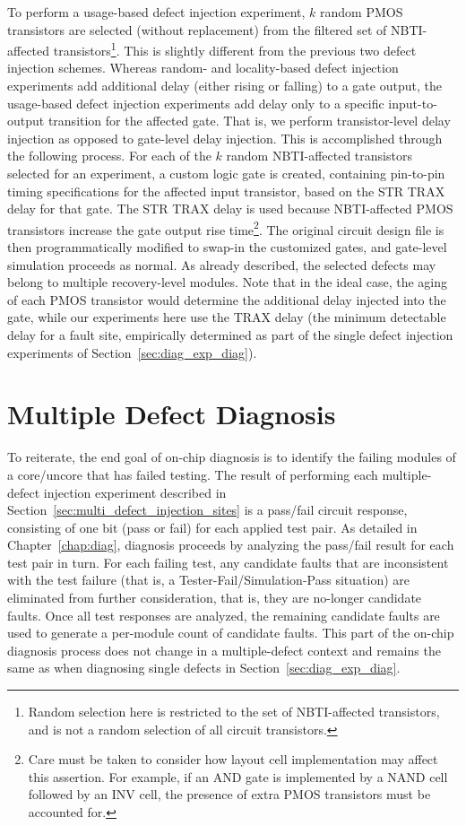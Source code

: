 To perform a usage-based defect injection experiment, $k$ random PMOS transistors are selected (without replacement) from the filtered set of NBTI-affected transistors\footnote{Random selection here is restricted to the set of NBTI-affected transistors, and is not a random selection of all circuit transistors.}.
%
This is slightly different from the previous two defect injection schemes.
%
Whereas random- and locality-based defect injection experiments add additional delay (either rising or falling) to a gate output, the usage-based defect injection experiments add delay only to a specific input-to-output transition for the affected gate.
%
That is, we perform transistor-level delay injection as opposed to gate-level delay injection.
%
This is accomplished through the following process.
%
For each of the $k$ random NBTI-affected transistors selected for an experiment, a custom logic gate is created, containing pin-to-pin timing specifications for the affected input transistor, based on the STR TRAX delay for that gate.
%
The STR TRAX delay is used because NBTI-affected PMOS transistors increase the gate output rise time\footnote{Care must be taken to consider how layout cell implementation may affect this assertion.
%
For example, if an AND gate is implemented by a NAND cell followed by an INV cell, the presence of extra PMOS transistors must be accounted for.}.
%
The original circuit design file is then programmatically modified to swap-in the customized gates, and gate-level simulation proceeds as normal.
%
As already described, the selected defects may belong to multiple recovery-level modules.
%
Note that in the ideal case, the aging of each PMOS transistor would determine the additional delay injected into the gate, while our experiments here use the TRAX delay (the minimum detectable delay for a fault site, empirically determined as part of the single defect injection experiments of Section~\ref{sec:diag_exp_diag}).


\section{Multiple Defect Diagnosis}
\label{sec:multi_diagnosis}
To reiterate, the end goal of on-chip diagnosis is to identify the failing modules of a core/uncore that has failed testing.
%
The result of performing each multiple-defect injection experiment described in Section~\ref{sec:multi_defect_injection_sites} is a pass/fail circuit response, consisting of one bit (pass or fail) for each applied test pair.
%
As detailed in Chapter~\ref{chap:diag}, diagnosis proceeds by analyzing the pass/fail result for each test pair in turn.
%
For each failing test, any candidate faults that are inconsistent with the test failure (that is, a Tester-Fail/Simulation-Pass situation) are eliminated from further consideration, that is, they are no-longer candidate faults.
%
Once all test responses are analyzed, the remaining candidate faults are used to generate a per-module count of candidate faults.
%
This part of the on-chip diagnosis process does not change in a multiple-defect context and remains the same as when diagnosing single defects in Section~\ref{sec:diag_exp_diag}.

